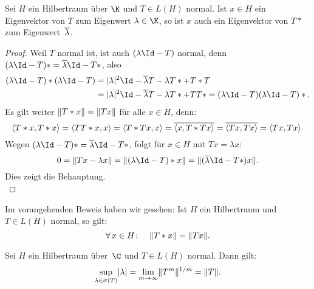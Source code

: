 \begin{thLemma}
    Sei $H$ ein Hilbertraum über $\K$ und $T\in L(H)$ normal. Ist $x\in H$ ein
    Eigenvektor von $T$ zum Eigenwert $\lambda\in\K$, so ist $x$ auch ein
    Eigenvektor von $T*$ zum Eigenwert~$\overline\lambda$.
\end{thLemma}

\begin{proof}
    Weil $T$ normal ist, ist auch $(\lambda\Id-T)$ normal, denn
    $(\lambda\Id-T)* = \ol\lambda\Id-T*$, also
    \begin{align*}
        (\lambda\Id-T)* (\lambda\Id-T)
        &= \abs{\lambda}^2\Id-\ol\lambda T - \lambda T* + T*T 
        \\
        &= \abs{\lambda}^2\Id-\ol\lambda T - \lambda T* + TT*
         = (\lambda\Id-T) (\lambda\Id-T)* 
    . \end{align*}
    Es gilt weiter $\lVert T*x\rVert = \lVert Tx\rVert$ für alle $x\in H$, denn:
    \[ \SP{T*x,T*x} = \SP{TT*x,x} = \SP{T*Tx,x} 
        = \ol{\SP{x,T*Tx}} = \ol{\SP{Tx,Tx}}
        = \SP{Tx,Tx}
    . \]
    Wegen $(\lambda\Id-T)* = \ol\lambda\Id-T*$, folgt für $x\in H$ mit
    $Tx=\lambda x$:
    \[ 0 = \norm{Tx-\lambda x} = \norm{(\lambda\Id-T)*x} 
         = \norm{(\ol\lambda\Id-T*)x}
    . \]
    Dies zeigt die Behauptung.
    \\
\end{proof}

\nnBemerkung Im vorangehenden Beweis haben wir gesehen:
Ist $H$ ein Hilbertraum und $T\in L(H)$ normal, so gilt:
\[ \forall\,x\in H\colon\quad \lVert T*x\rVert = \lVert Tx\rVert  . \]

\begin{thLemma} \label{vl22:lemma9.4}
    Sei $H$ ein Hilbertraum über~$\C$ und $T\in L(H)$ normal. Dann gilt:
    \[ \sup_{\lambda\in\sigma(T)} \lvert\lambda\rvert 
        = \lim_{m\to\infty} \lVert T^m\rVert^{1/m} = \lVert T\rVert
    . \]
\end{thLemma}

